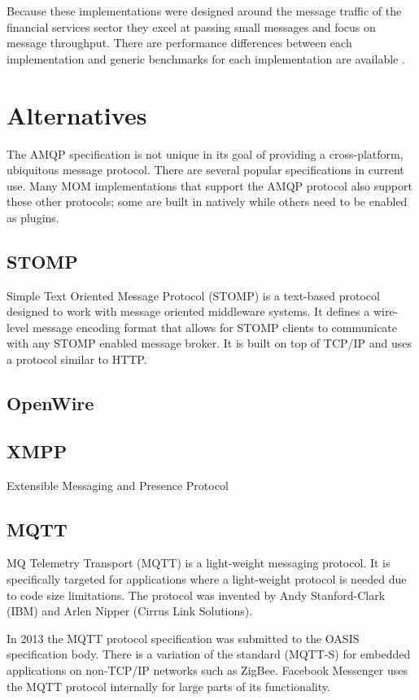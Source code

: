 \documentclass{thesis}
\begin{document}

Because these implementations were designed around the message traffic of the financial services sector they excel at passing small messages and focus on message throughput.  There are performance differences between each implementation and generic benchmarks for each implementation are available \cite{todo}\cite{todo}.


\section{Alternatives}
The AMQP specification is not unique in its goal of providing a cross-platform, ubiquitous message protocol.  There are several popular specifications in current use.  Many MOM implementations that support the AMQP protocol also support these other protocols; some are built in natively while others need to be enabled as plugins.   

\subsection{STOMP}
Simple Text Oriented Message Protocol (STOMP) is a text-based protocol designed to work with message oriented middleware systems.  It defines a wire-level message encoding format that allows for STOMP clients to communicate with any STOMP enabled message broker.  It is built on top of TCP/IP and uses a protocol similar to HTTP.  

\subsection{OpenWire}

\subsection{XMPP}
Extensible Messaging and Presence Protocol

\subsection{MQTT}
MQ Telemetry Transport (MQTT) is a light-weight messaging protocol.  It is specifically targeted for applications where a light-weight protocol is needed due to code size limitations.  The protocol was invented by Andy Stanford-Clark (IBM) and Arlen Nipper (Cirrus Link Solutions).  

In 2013 the MQTT protocol specification was submitted to the OASIS specification body.  There is a variation of the standard (MQTT-S) for embedded applications on non-TCP/IP networks such as ZigBee.  Facebook Messenger uses the MQTT protocol internally for large parts of its functionality. 
\end{document}
